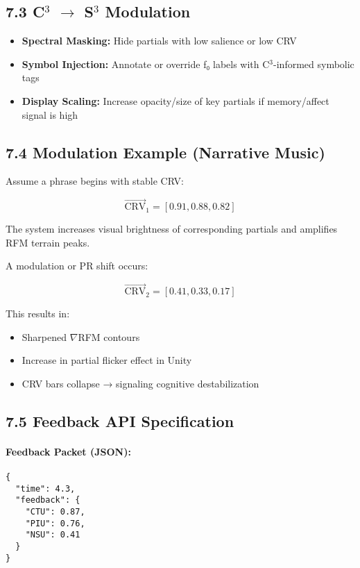 \subsection*{7.3 C$^3$ $\rightarrow$ S$^3$ Modulation}

\begin{itemize}
    \item \textbf{Spectral Masking:} Hide partials with low salience or low CRV
    \item \textbf{Symbol Injection:} Annotate or override f₀ labels with C$^3$-informed symbolic tags
    \item \textbf{Display Scaling:} Increase opacity/size of key partials if memory/affect signal is high
\end{itemize}

\subsection*{7.4 Modulation Example (Narrative Music)}

Assume a phrase begins with stable CRV:

\[
\vec{\text{CRV}}_1 = [0.91, 0.88, 0.82]
\]

The system increases visual brightness of corresponding partials and amplifies RFM terrain peaks.

A modulation or PR shift occurs:

\[
\vec{\text{CRV}}_2 = [0.41, 0.33, 0.17]
\]

This results in:
\begin{itemize}
    \item Sharpened $\nabla$RFM contours
    \item Increase in partial flicker effect in Unity
    \item CRV bars collapse → signaling cognitive destabilization
\end{itemize}

\subsection*{7.5 Feedback API Specification}

\paragraph{Feedback Packet (JSON):}

\begin{verbatim}
{
  "time": 4.3,
  "feedback": {
    "CTU": 0.87,
    "PIU": 0.76,
    "NSU": 0.41
  }
}
\end{verbatim}

